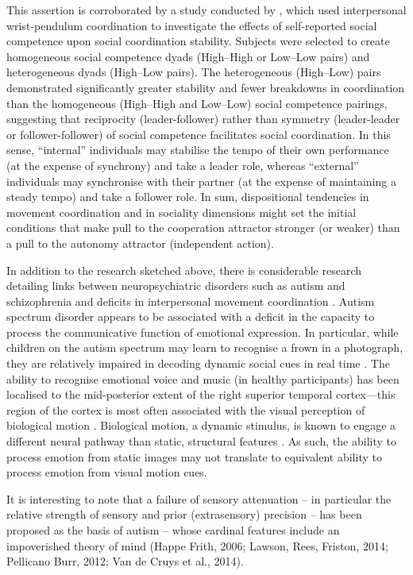 \begin{CJK}{UTF8}{gbsn}
    This assertion is corroborated by a study conducted by \textcite{Schmidt1994}, which used interpersonal wrist-pendulum coordination to investigate the effects of self-reported social competence \citep[c.f.][]{Riggio1996} upon social coordination stability.  Subjects were selected to create homogeneous social competence dyads (High–High or Low–Low pairs) and heterogeneous dyads (High–Low pairs). The heterogeneous (High–Low) pairs demonstrated significantly greater stability and fewer breakdowns in coordination than the homogeneous (High–High and Low–Low) social competence pairings, suggesting that reciprocity (leader-follower) rather than symmetry (leader-leader or follower-follower) of social competence facilitates social coordination.  In this sense,  ``internal'' individuals may stabilise the tempo of their own performance (at the expense of synchrony) and take a leader role, whereas ``external'' individuals may synchronise with their partner (at the expense of maintaining a steady tempo) and take a follower role.  In sum,  dispositional tendencies in movement coordination and in sociality dimensions might set the initial conditions that make pull to the cooperation attractor stronger (or weaker) than a pull to the autonomy attractor (independent action).

    In addition to the research sketched above, there is considerable research detailing links between neuropsychiatric disorders such as autism and schizophrenia and deficits in interpersonal movement coordination \citep{Frith2013,Wheatley2016}.  Autism spectrum disorder appears to be associated with a deficit in the capacity to process the communicative function of emotional expression. In particular, while children on the autism spectrum may learn to recognise a frown in a photograph, they are relatively impaired in decoding dynamic social cues in real time \citep{Hobson1986}.  The ability to recognise emotional voice and music (in healthy participants) has been localised to the mid-posterior extent of the right superior temporal cortex---this region of the cortex is most often associated with the visual perception of biological motion \citep{Pelphrey2005}.  Biological motion, a dynamic stimulus, is known to engage a different neural pathway than static, structural features \citep{Haxby2000}.  As such, the ability to process emotion from static images may not translate to equivalent ability to process emotion from visual motion cues.

    It is interesting to note that a failure of sensory attenuation – in particular the relative strength of sensory and prior (extrasensory) precision – has been proposed as the basis of autism – whose cardinal features include an impoverished theory of mind (Happe  Frith, 2006; Lawson, Rees, Friston, 2014; Pellicano Burr, 2012; Van de Cruys et al., 2014).


\end{CJK}

